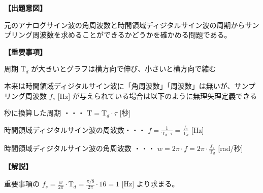 \noindent \textbf{【出題意図】}

\bigskip
\noindent 元のアナログサイン波の角周波数と時間領域ディジタルサイン波の周期からサンプリング周波数を求めることができるかどうかを確かめる問題である。

\vspace{1em}
\noindent \textbf{【重要事項】}

\bigskip
\noindent 周期 $\textrm{T}_d$ が大きいとグラフは横方向で伸び、小さいと横方向で縮む

\bigskip
\noindent 本来は時間領域ディジタルサイン波に「角周波数」「周波数」は無いが、サンプリング周波数 $f_s$ [Hz] が与えられている場合は以下のように無理矢理定義できる

\bigskip
\noindent 秒に換算した周期 ・・・ $\textrm{T} = \textrm{T}_d \cdot \tau$ [秒]

\bigskip
\noindent 時間領域ディジタルサイン波の周波数・・・ $f = \frac{1}{\textrm{T}_d\cdot\tau} = \frac{f_s}{\textrm{T}_d}$ [Hz]

\bigskip
\noindent 時間領域ディジタルサイン波の角周波数 ・・・ $w = 2\pi \cdot f = 2 \pi \cdot \frac{f_s}{\textrm{T}_d}$ [rad/秒]

\bigskip

\vspace{1em}
\noindent \textbf{【解説】}

\bigskip
\noindent 重要事項の $f_s = \frac{w}{2\pi}\cdot \textrm{T}_d = \frac{\pi/8}{2\pi}\cdot 16 = 1$ [Hz] より求まる。
